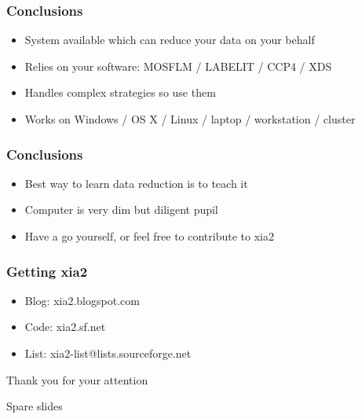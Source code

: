 \documentclass[slides,compress]{beamer}
\begin{document}
\begin{frame}
\frametitle{Conclusions}
\begin{itemize}
\item{System available which can reduce your data on your behalf}
\item{Relies on your software: MOSFLM / LABELIT / CCP4 / XDS}
\item{Handles complex strategies so use them}
\item{Works on Windows / OS X / Linux / laptop / workstation / cluster}
\end{itemize}
\end{frame}

\begin{frame}
\frametitle{Conclusions}
\begin{itemize}
\item{Best way to learn data reduction is to teach it}
\item{Computer is very dim but diligent pupil}
\item{Have a go yourself, or feel free to contribute to xia2}
\end{itemize}
\end{frame}

\begin{frame}
\frametitle{Getting xia2}
\begin{itemize}
\item{Blog: xia2.blogspot.com}
\item{Code: xia2.sf.net}
\item{List: xia2-list@lists.sourceforge.net}
\end{itemize}
\end{frame}

\begin{frame}
\begin{center}
\Huge Thank you for your attention
\end{center}
\end{frame}

\begin{frame}
\begin{center}
\Huge Spare slides
\end{center}
\end{frame}
\end{document}

